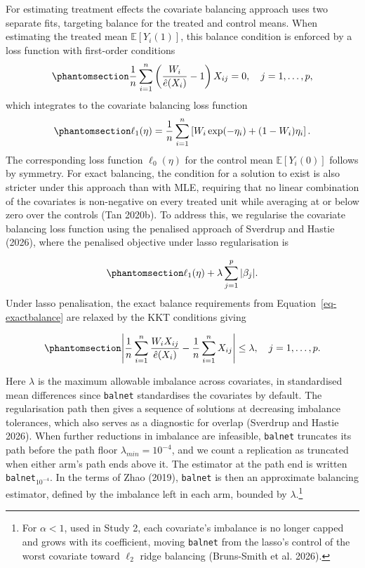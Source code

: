 \documentclass[
  12pt,
  a4paper,
]{article}
\begin{document}
For estimating treatment effects the covariate balancing approach uses
two separate fits, targeting balance for the treated and control means.
When estimating the treated mean \(\mathbb{E}[Y_i(1)]\), this balance
condition is enforced by a loss function with first-order conditions
\begin{equation}\protect\phantomsection\label{eq-bal-foc}{\frac{1}{n} \sum_{i=1}^{n} \left( \frac{W_i}{\hat{e}(X_i)} - 1 \right) X_{ij} = 0, \quad j = 1, \ldots, p,}\end{equation}
which integrates to the covariate balancing loss function
\begin{equation}\protect\phantomsection\label{eq-bal-loss}{\ell_1(\eta) = \frac{1}{n} \sum_{i=1}^{n} \left[ W_i \exp(-\eta_i) + (1 - W_i) \eta_i \right].}\end{equation}
The corresponding loss function \(\ell_0(\eta)\) for the control mean
\(\mathbb{E}[Y_i(0)]\) follows by symmetry. For exact balancing, the
condition for a solution to exist is also stricter under this approach
than with MLE, requiring that no linear combination of the covariates is
non-negative on every treated unit while averaging at or below zero over
the controls (Tan 2020b). To address this, we regularise the covariate
balancing loss function using the penalised approach of Sverdrup and
Hastie (2026), where the penalised objective under lasso regularisation
is

\begin{equation}\protect\phantomsection\label{eq-bal-pen}{\ell_1(\eta) + \lambda \sum_{j=1}^{p} |\beta_j|.}\end{equation}
Under lasso penalisation, the exact balance requirements from
Equation~\ref{eq-exactbalance} are relaxed by the KKT conditions giving

\begin{equation}\protect\phantomsection\label{eq-kkt}{\left| \frac{1}{n} \sum_{i=1}^{n} \frac{W_i X_{ij}}{\hat{e}(X_i)} - \frac{1}{n} \sum_{i=1}^{n} X_{ij} \right| \leq \lambda, \quad j = 1, \ldots, p.}\end{equation}

Here \(\lambda\) is the maximum allowable imbalance across covariates,
in standardised mean differences since \texttt{balnet} standardises the
covariates by default. The regularisation path then gives a sequence of
solutions at decreasing imbalance tolerances, which also serves as a
diagnostic for overlap (Sverdrup and Hastie 2026). When further
reductions in imbalance are infeasible, \texttt{balnet} truncates its
path before the path floor \(\lambda_{min} = 10^{-4}\), and we count a
replication as truncated when either arm's path ends above it. The
estimator at the path end is written \texttt{balnet}\(_{10^{-4}}\). In
the terms of Zhao (2019), \texttt{balnet} is then an approximate
balancing estimator, defined by the imbalance left in each arm, bounded
by \(\lambda\).\footnote{For \(\alpha < 1\), used in Study 2, each
  covariate's imbalance is no longer capped and grows with its
  coefficient, moving \texttt{balnet} from the lasso's control of the
  worst covariate toward \(\ell_2\) ridge balancing (Bruns-Smith et al.
  2026).}
\end{document}
